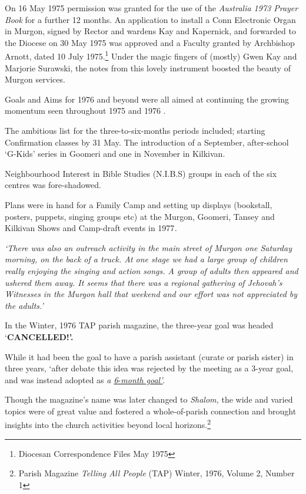 On 16 May 1975 permission was granted for the use of the \emph{Australia 1973 Prayer Book} for a further 12 months. An application to install a Conn Electronic Organ in Murgon, signed by Rector and wardens Kay and Kapernick, and forwarded to the Diocese on 30 May 1975 was approved and a Faculty granted by Archbishop Arnott, dated 10 July 1975.\footnote{Diocesan Correspondence Files May 1975} Under the magic fingers of (mostly) Gwen Kay and Marjorie Surawski, the notes from this lovely instrument boosted the beauty of Murgon services.

Goals and Aims for 1976 and beyond were all aimed at continuing the growing momentum seen throughout 1975 and 1976 .

The ambitious list for the three-to-six-months periods included; starting Confirmation classes by 31 May. The introduction of a September, after-school `G-Kids' series in Goomeri and one in November in Kilkivan.

Neighbourhood Interest in Bible Studies (N.I.B.S) groups in each of the six centres was fore-shadowed.

Plans were in hand for a Family Camp and setting up displays (bookstall, posters, puppets, singing groups etc) at the Murgon, Goomeri, Tansey and Kilkivan Shows and Camp-draft events in 1977\emph{.}

\emph{`There was also an outreach activity in the main street of Murgon one Saturday morning, on the back of a truck. At one stage we had a large group of children really enjoying the singing and action songs. A group of adults then appeared and ushered them away. It seems that there was a regional gathering of Jehovah's Witnesses in the Murgon hall that weekend and our effort was not appreciated by the adults.'}

In the Winter, 1976 TAP parish magazine, the three-year goal was headed `\textbf{CANCELLED!'.}

While it had been the goal to have a parish assistant (curate or parish sister) in three years, `after debate this idea was rejected by the meeting as a 3-year goal, and was instead adopted as \emph{a \underline{6}}\underline{-\emph{month goal'}}.

Though the magazine's name was later changed to \emph{Shalom,} the wide and varied topics were of great value and fostered a whole-of-parish connection and brought insights into the church activities beyond local horizons.\footnote{Parish Magazine \emph{Telling All People} (TAP) Winter, 1976, Volume 2, Number 1}

